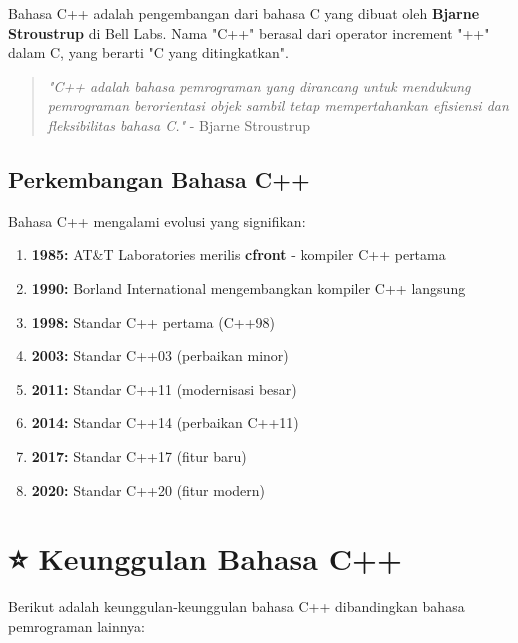Bahasa C++ adalah pengembangan dari bahasa C yang dibuat oleh \textbf{Bjarne Stroustrup} di Bell Labs. Nama "C++" berasal dari operator increment "++" dalam C, yang berarti "C yang ditingkatkan".

\begin{quote}
\textit{"C++ adalah bahasa pemrograman yang dirancang untuk mendukung pemrograman berorientasi objek sambil tetap mempertahankan efisiensi dan fleksibilitas bahasa C."} - Bjarne Stroustrup
\end{quote}

\subsection{Perkembangan Bahasa C++}

Bahasa C++ mengalami evolusi yang signifikan:

\begin{enumerate}
\item \textbf{1985:} AT\&T Laboratories merilis \textbf{cfront} - kompiler C++ pertama
\item \textbf{1990:} Borland International mengembangkan kompiler C++ langsung
\item \textbf{1998:} Standar C++ pertama (C++98)
\item \textbf{2003:} Standar C++03 (perbaikan minor)
\item \textbf{2011:} Standar C++11 (modernisasi besar)
\item \textbf{2014:} Standar C++14 (perbaikan C++11)
\item \textbf{2017:} Standar C++17 (fitur baru)
\item \textbf{2020:} Standar C++20 (fitur modern)
\end{enumerate}

\section{⭐ Keunggulan Bahasa C++}

Berikut adalah keunggulan-keunggulan bahasa C++ dibandingkan bahasa pemrograman lainnya:

